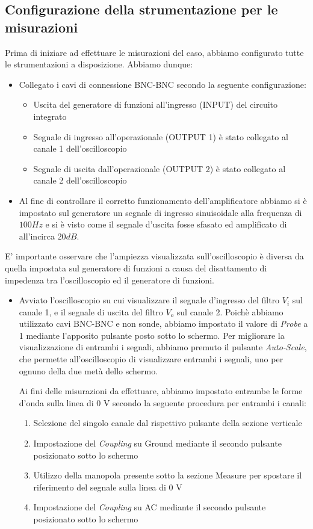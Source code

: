 \subsection{\textbf{Configurazione della strumentazione per le misurazioni}}
Prima di iniziare ad effettuare le misurazioni del caso, abbiamo configurato tutte le strumentazioni a disposizione. Abbiamo dunque:
\begin{itemize}
    \item Collegato i cavi di connessione BNC-BNC secondo la seguente configurazione:
    \begin{itemize}
        \item Uscita del generatore di funzioni all'ingresso (INPUT) del circuito integrato
        \item  Segnale di ingresso all'operazionale (OUTPUT 1) è stato collegato al canale 1 dell'oscilloscopio
        \item  Segnale di uscita dall'operazionale (OUTPUT 2) è stato collegato al canale 2 dell'oscilloscopio
    \end{itemize}
    \item Al fine di controllare il corretto funzionamento dell'amplificatore abbiamo si è impostato sul generatore un segnale di ingresso sinuisoidale alla frequenza di $100Hz$ e si è visto come il segnale d'uscita fosse sfasato ed amplificato di all'incirca $20dB$.  
\end{itemize}
E' importante osservare che l'ampiezza visualizzata sull'oscilloscopio è diversa da quella impostata sul generatore di funzioni a causa del disattamento di impedenza tra l'oscilloscopio ed il generatore di funzioni.
\begin{itemize}
    \item Avviato l'oscilloscopio su cui visualizzare il segnale d'ingresso del filtro $V_i$ sul canale 1, e il segnale di uscita del filtro $V_o$ sul canale 2.
    Poichè abbiamo utilizzato cavi BNC-BNC e non sonde, abbiamo impostato il valore di \emph{Probe} a 1 mediante l'apposito pulsante posto sotto lo schermo.
    Per migliorare la visualizzazione di entrambi i segnali, abbiamo premuto il pulsante \emph{Auto-Scale}, che permette all'oscilloscopio di visualizzare entrambi i segnali, uno per ognuno della due metà dello schermo.
    
    Ai fini delle misurazioni da effettuare, abbiamo impostato entrambe le forme d'onda sulla linea di 0 V secondo la seguente procedura per entrambi i canali:
    \begin{enumerate}
        \item Selezione del singolo canale dal rispettivo pulsante della sezione verticale
        \item Impostazione del \emph{Coupling} su Ground mediante il secondo pulsante posizionato sotto lo schermo
        \item Utilizzo della manopola presente sotto la sezione Measure per spostare il riferimento del segnale sulla linea di 0 V
        \item Impostazione del \emph{Coupling} su AC mediante il secondo pulsante posizionato sotto lo schermo  
\end{enumerate}
\end{itemize}


